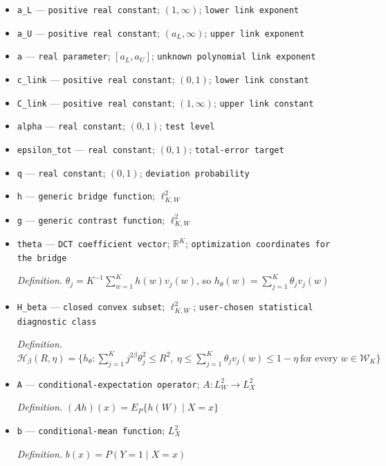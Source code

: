 \documentclass{article}
\begin{document}
\begin{itemize}
  \item \texttt{a\_\allowbreak{}L} --- \texttt{positive real constant}; \((1,\infty)\); \texttt{lower link exponent}
  \item \texttt{a\_\allowbreak{}U} --- \texttt{positive real constant}; \((a_L,\infty)\); \texttt{upper link exponent}
  \item \texttt{a} --- \texttt{real parameter}; \([a_L,a_U]\); \texttt{unknown polynomial link exponent}
  \item \texttt{c\_\allowbreak{}link} --- \texttt{positive real constant}; \((0,1)\); \texttt{lower link constant}
  \item \texttt{C\_\allowbreak{}link} --- \texttt{positive real constant}; \((1,\infty)\); \texttt{upper link constant}
  \item \texttt{alpha} --- \texttt{real constant}; \((0,1)\); \texttt{test level}
  \item \texttt{epsilon\_\allowbreak{}tot} --- \texttt{real constant}; \((0,1)\); \texttt{total-\allowbreak{}error target}
  \item \texttt{q} --- \texttt{real constant}; \((0,1)\); \texttt{deviation probability}
  \item \texttt{h} --- \texttt{generic bridge function}; \(\ell^2_{K,W}\)
  \item \texttt{g} --- \texttt{generic contrast function}; \(\ell^2_{K,W}\)
  \item \texttt{theta} --- \texttt{DCT coefficient vector}; \(\mathbb R^K\); \texttt{optimization coordinates for the bridge}
  \par\smallskip\noindent\emph{Definition.} \(\theta_j=K^{-1}\sum_{w=1}^K h(w)v_j(w)\), so \(h_\theta(w)=\sum_{j=1}^K\theta_jv_j(w)\)
  \item \texttt{H\_\allowbreak{}beta} --- \texttt{closed convex subset}; \(\ell^2_{K,W}\); \texttt{user-\allowbreak{}chosen statistical diagnostic class}
  \par\smallskip\noindent\emph{Definition.} \(\mathcal H_\beta(R,\eta)=\{h_\theta:\sum_{j=1}^K j^{2\beta}\theta_j^2\le R^2,\ \eta\le\sum_{j=1}^K\theta_jv_j(w)\le1-\eta\ \text{for every }w\in\mathcal W_K\}\)
  \item \texttt{A} --- \texttt{conditional-\allowbreak{}expectation operator}; \(A:L^2_W\to L^2_X\)
  \par\smallskip\noindent\emph{Definition.} \((Ah)(x)=E_P\{h(W)\mid X=x\}\)
  \item \texttt{b} --- \texttt{conditional-\allowbreak{}mean function}; \(L^2_X\)
  \par\smallskip\noindent\emph{Definition.} \(b(x)=P(Y=1\mid X=x)\)

\end{itemize}
\end{document}
